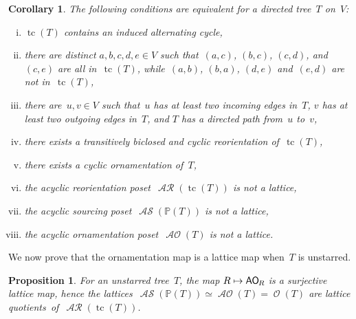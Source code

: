 \documentclass{amsart}
\newtheorem{corollary}[theorem]{Corollary}
\newtheorem{proposition}[theorem]{Proposition}
\theoremstyle{definition}
\renewcommand{\c}[1]{\mathcal{#1}} %
\DeclareMathOperator{\tc}{tc} %
\newcommand{\mymap}[2]{\mathsf{#1}_{\hspace{-.7pt}#2}}
\DeclareMathOperator{\Orn}{\c{O}}  %
\DeclareMathOperator{\AOrn}{\c{AO}}  %
\newcommand{\aorn}[1]{\mymap{AO}{#1}}  %
\DeclareMathOperator{\AReori}{\c{AR}}  %
\DeclareMathOperator{\ASour}{\mathcal{AS}}  %
\newcommand{\PP}{\mathbb P} %
\begin{document}
\begin{corollary}
\label{coro:starredCharacterizations}
The following conditions are equivalent for a directed tree~$T$ on~$V$:
\begin{enumerate}[(i)]
\item $\tc(T)$ contains an induced alternating cycle,
\item there are distinct $a,b,c,d,e \in V$ such that~$(a,c)$, $(b,c)$, $(c,d)$, and~$(c,e)$ are all in~$\tc(T)$, while~$(a,b)$, $(b,a)$, $(d,e)$ and~$(e,d)$ are not in~$\tc(T)$,
\item there are~$u,v \in V$ such that~$u$ has at least two incoming edges in~$T$, $v$ has at least two outgoing edges in~$T$, and $T$ has a directed path from~$u$ to~$v$,
\item there exists a transitively biclosed and cyclic reorientation of~$\tc(T)$,
\item there exists a cyclic ornamentation of~$T$,
\item the acyclic reorientation poset~$\AReori(\tc(T))$ is not a lattice,
\item the acyclic sourcing poset~$\ASour(\PP(T))$ is not a lattice,
\item the acyclic ornamentation poset~$\AOrn(T)$ is not a lattice.
\end{enumerate}
\end{corollary}

We now prove that the ornamentation map is a lattice map when~$T$ is unstarred.

\begin{proposition}
\label{prop:AReori2AOrnLatticeMapUT}
For an unstarred tree~$T$, the map $R \mapsto \aorn{R}$ is a surjective lattice map, hence the lattices~$\ASour(\PP(T)) \simeq \AOrn(T) = \Orn(T)$ are lattice quotients~of~$\AReori(\tc(T))$.
\end{proposition}
\end{document}
